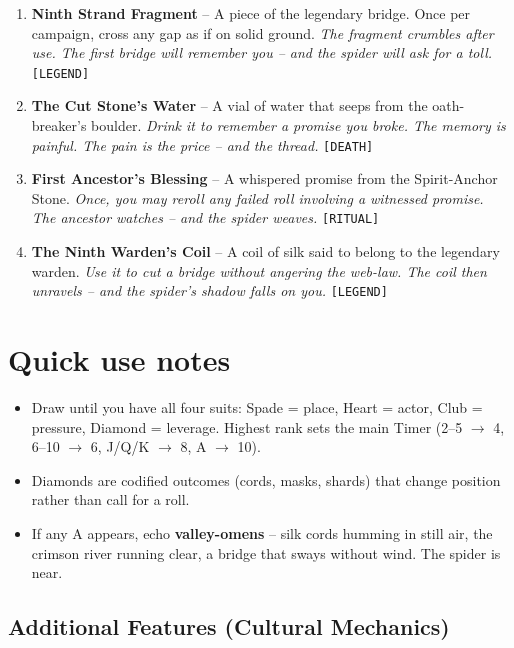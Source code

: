 \begin{enumerate}
  \hfill \textit{The ochre never dries. The promise remains witnessable forever -- until the spider cuts the thread.} \texttt{[CRAFT]}
\item[\card{\diamondsuit}{J}] \textbf{Ninth Strand Fragment} -- A piece of the legendary bridge. Once per campaign, cross any gap as if on solid ground.
  \hfill \textit{The fragment crumbles after use. The first bridge will remember you -- and the spider will ask for a toll.} \texttt{[LEGEND]}
\item[\card{\diamondsuit}{Q}] \textbf{The Cut Stone's Water} -- A vial of water that seeps from the oath-breaker's boulder.
  \hfill \textit{Drink it to remember a promise you broke. The memory is painful. The pain is the price -- and the thread.} \texttt{[DEATH]}
\item[\card{\diamondsuit}{K}] \textbf{First Ancestor's Blessing} -- A whispered promise from the Spirit-Anchor Stone.
  \hfill \textit{Once, you may reroll any failed roll involving a witnessed promise. The ancestor watches -- and the spider weaves.} \texttt{[RITUAL]}
\item[\card{\diamondsuit}{A}] \textbf{The Ninth Warden's Coil} -- A coil of silk said to belong to the legendary warden.
  \hfill \textit{Use it to cut a bridge without angering the web-law. The coil then unravels -- and the spider's shadow falls on you.} \texttt{[LEGEND]}
\end{enumerate}

\section*{Quick use notes}
\label{sec:lethaiar-quick-use}
\begin{itemize}
\item Draw until you have all four suits: Spade = place, Heart = actor, Club = pressure, Diamond = leverage. Highest rank sets the main Timer (2--5 \(\rightarrow\) 4, 6--10 \(\rightarrow\) 6, J/Q/K \(\rightarrow\) 8, A \(\rightarrow\) 10).
\item Diamonds are codified outcomes (cords, masks, shards) that change position rather than call for a roll.
\item If any A appears, echo \textbf{valley-omens} -- silk cords humming in still air, the crimson river running clear, a bridge that sways without wind. The spider is near.
\end{itemize}

\subsection*{Additional Features (Cultural Mechanics)}
\label{sec:lethaiar-mechanics}

